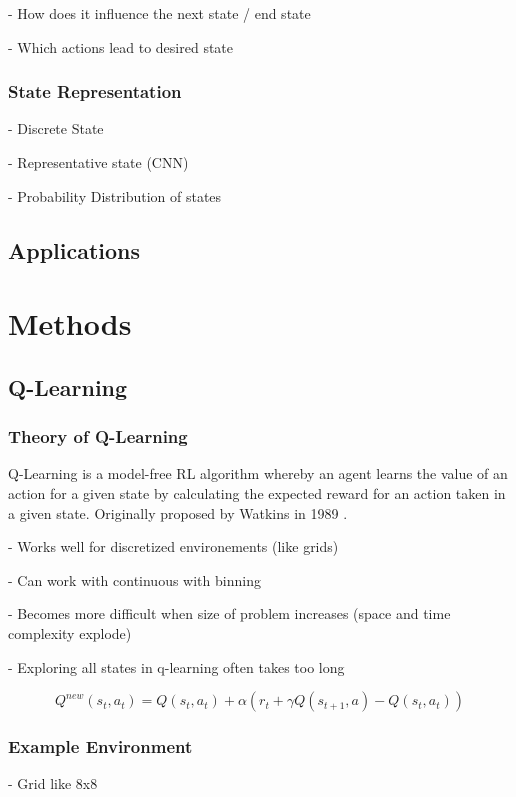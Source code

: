 \documentclass{jfm}
\begin{document}
- How does it influence the next state / end state

- Which actions lead to desired state

\subsubsection{State Representation}
- Discrete State

- Representative state (CNN)

- Probability Distribution of states

\subsection{Applications}



\section{Methods}
\subsection{Q-Learning}
\subsubsection{Theory of Q-Learning}
Q-Learning is a model-free RL algorithm whereby an agent learns the value of an action for a given state  by calculating the expected reward for an action taken in a given state. Originally proposed by Watkins in 1989 \cite{Watkins1989}.

- Works well for discretized environements (like grids)

- Can work with continuous with binning

- Becomes more difficult when size of problem increases (space and time complexity explode)

- Exploring all states in q-learning often takes too long

\begin{equation}
Q^{new}(s_t,a_t) = Q(s_t,a_t) + \alpha \left(r_t +  \gamma Q(s_{t+1},a) - Q(s_t,a_t)\right)
\end{equation}

\subsubsection{Example Environment}
- Grid like 8x8
\end{document}
